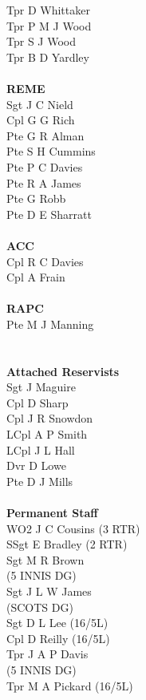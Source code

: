 \begin{multicols}{3}
  Tpr D Whittaker \\
  Tpr P M J Wood \\
  Tpr S J Wood \\
  Tpr B D Yardley \\
  \\
  \textbf{REME} \\
  Sgt J C Nield \\
  Cpl G G Rich \\
  Pte G R Alman \\
  Pte S H Cummins \\
  Pte P C Davies \\
  Pte R A James \\
  Pte G Robb \\
  Pte D E Sharratt \\
  \\
  \textbf{ACC} \\
  Cpl R C Davies \\
  Cpl A Frain \\
  \\
  \textbf{RAPC} \\
  Pte M J Manning \\
  \\
  \\
  \textbf{Attached Reservists} \\
  Sgt J Maguire \\
  Cpl D Sharp \\
  Cpl J R Snowdon \\
  LCpl A P Smith \\
  LCpl J L Hall \\
  Dvr D Lowe \\
  Pte D J Mills \\
  \\
  \textbf{Permanent Staff} \\
  WO2 J C Cousins (3 RTR) \\
  SSgt E Bradley (2 RTR) \\
  Sgt M R Brown \\ \indent (5 INNIS DG) \\
  Sgt J L W James \\ \indent (SCOTS DG) \\
  Sgt D L Lee (16/5L) \\
  Cpl D Reilly (16/5L) \\
  Tpr J A P Davis \\ \indent (5 INNIS DG) \\
  Tpr M A Pickard (16/5L) \\
\end{multicols}
